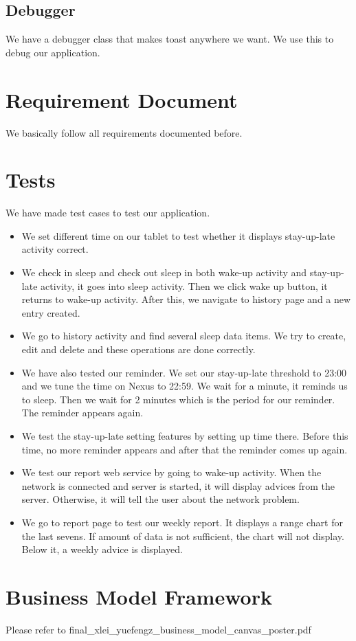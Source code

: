 \documentclass[14pt]{extreport}
\begin{document}
\section{Debugger}
We have a debugger class that makes toast anywhere we want. We use this to debug our application.

\chapter{Requirement Document}
We basically follow all requirements documented before. 

\chapter{Tests}
We have made test cases to test our application.

\begin{itemize}
\item We set different time on our tablet to test whether it displays stay-up-late activity correct.
\item We check in sleep and check out sleep in both wake-up activity and stay-up-late activity, it goes into sleep activity. Then we click wake up button, it returns to wake-up activity. After this, we navigate to history page and a new entry created.
\item We go to history activity and find several sleep data items. We try to create, edit and delete and these operations are done correctly.
\item We have also tested our reminder. We set our stay-up-late threshold to 23:00 and we tune the time on Nexus to 22:59. We wait for a minute, it reminds us to sleep. Then we wait for 2 minutes which is the period for our reminder. The reminder appears again.
\item We test the stay-up-late setting features by setting up time there. Before this time, no more reminder appears and after that the reminder comes up again.
\item We test our report web service by going to wake-up activity. When the network is connected and server is started, it will display advices from the server. Otherwise, it will tell the user about the network problem.
\item We go to report page to test our weekly report. It displays a range chart for the last sevens. If amount of data is not sufficient, the chart will not display. Below it, a weekly advice is displayed. 
\end{itemize}


\chapter{Business Model Framework}
Please refer to final\_xlei\_yuefengz\_business\_model\_canvas\_poster.pdf
\end{document}
